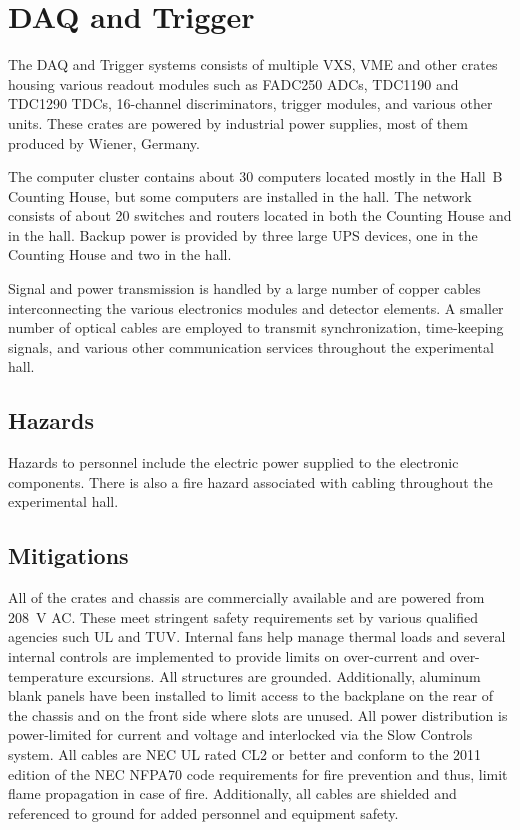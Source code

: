 \section{DAQ and Trigger}

The DAQ and Trigger systems consists of multiple VXS, VME and other crates housing 
various readout modules such as FADC250 ADCs, TDC1190 and TDC1290 TDCs, 16-channel 
discriminators, trigger modules, and various other units. These crates are powered 
by industrial power supplies, most of them produced by Wiener, Germany.

The computer cluster contains about 30 computers located mostly in the Hall~B Counting 
House, but some computers are installed in the hall. The network consists of about 20 
switches and routers located in both the Counting House and in the hall. Backup power 
is provided by three large UPS devices, one in the Counting House and two in the hall.

Signal and power transmission is handled by a large number of copper cables interconnecting  
the various electronics modules and detector elements. A smaller number of optical cables 
are employed to transmit synchronization, time-keeping signals, and various other 
communication services throughout the experimental hall.

\subsection{Hazards} 

Hazards to personnel include the electric power supplied to the electronic components. There 
is also a fire hazard associated with cabling throughout the experimental hall.

\subsection{Mitigations}

All of the crates and chassis are commercially available and are powered from 208~V AC. 
These meet stringent safety requirements set by various qualified agencies such UL and TUV. 
Internal fans help manage thermal loads and several internal controls are implemented to 
provide limits on over-current and over-temperature excursions. All structures are grounded. 
Additionally, aluminum blank panels have been installed to limit access to the backplane on 
the rear of the chassis and on the front side where slots are unused. All power distribution 
is power-limited for current and voltage and interlocked via the Slow Controls system. All 
cables are NEC UL rated CL2 or better and conform to the 2011 edition of the NEC NFPA70 code 
requirements for fire prevention and thus, limit flame propagation in case of fire. Additionally, 
all cables are shielded and referenced to ground for added personnel and equipment safety.

